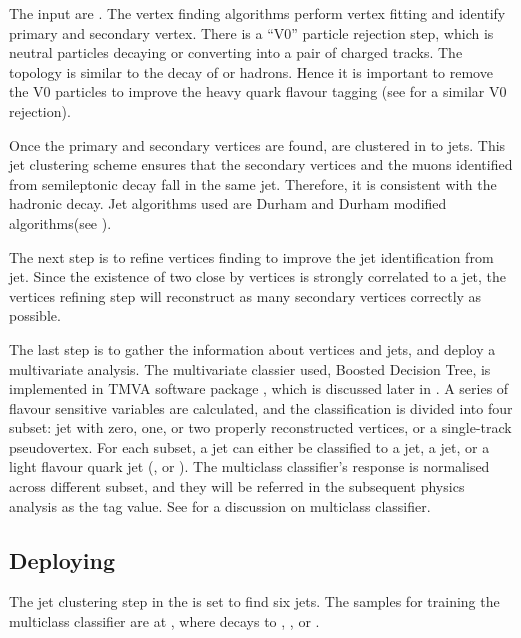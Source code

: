 The input are \PFOs. The vertex finding algorithms perform vertex fitting and identify primary and secondary vertex. There is a ``V0'' particle rejection step, which is neutral particles decaying or converting into a pair of charged tracks. The topology is similar to the decay of \Pbottom or \Pcharm hadrons. Hence it is important to remove the V0 particles to improve the heavy quark flavour tagging (see  for a similar V0 rejection).

Once the primary and secondary vertices are found, \PFOs are clustered in to jets. This jet clustering scheme ensures that the secondary vertices and the muons identified from semileptonic decay fall in the same jet. Therefore, it is consistent with the hadronic decay. Jet algorithms used are Durham and Durham modified algorithms(see \Section{}).

The next step is to refine vertices finding to improve the \Pbottom jet identification from \Pcharm jet. Since the existence of two close by vertices is strongly correlated to a \Pbottom jet, the vertices refining step will reconstruct as many secondary vertices correctly as possible.

The last step is to gather the information about vertices and jets, and deploy a multivariate analysis. The multivariate classier used, Boosted Decision Tree,  is implemented in TMVA software package \cite{Hocker:2007ht}, which is discussed later in \Section{}. A series of flavour sensitive variables are calculated, and the classification is divided into four subset: jet with zero, one, or two properly reconstructed vertices, or a single-track pseudovertex. For each subset, a jet can either be classified to a \Pbottom jet, a \Pcharm jet, or a light flavour quark jet (\Pup, \Pdown or \Pstrange). The multiclass classifier's response is normalised across different subset, and they will be referred in the subsequent physics analysis as the tag value. See \Section{} for a discussion on multiclass classifier.

\subsection{Deploying \lcfiplus}

The jet clustering step in the \lcfiplus is set to find six jets. The samples for training the multiclass classifier are \HepProcess{\Pep \Pem \to \PZ \APnu \Pnu} at , where \PZ decays to \HepProcess{\Pbottom\APbottom}, \HepProcess{\Pcharm\APcharm}, or \HepProcess{\Pup\APup/\Pdown\APdown/\Pstrange\APstrange}.

